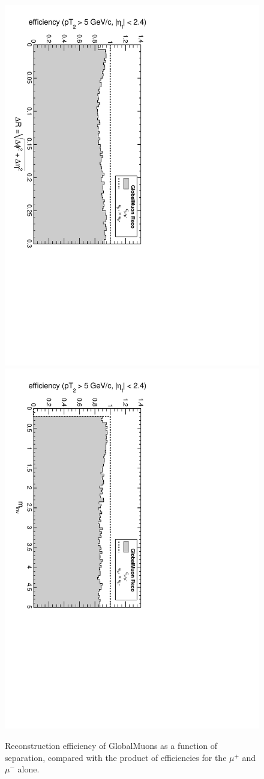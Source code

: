 \documentclass[12pt]{article}
\begin{document}
\begin{figure}[p]
\includegraphics[height=0.5\linewidth, angle=90]{fig/acceptance6_plot/vsdR_GlobalMuons.pdf}
\includegraphics[height=0.5\linewidth, angle=90]{fig/acceptance6_plot/vsmass_GlobalMuons.pdf}

\caption{Reconstruction efficiency of GlobalMuons as a function of
  separation, compared with the product of efficiencies for the
  $\mu^+$ and $\mu^-$ alone. \label{fig:vseverything_GlobalMuons}}
\end{figure}

\clearpage
\end{document}
